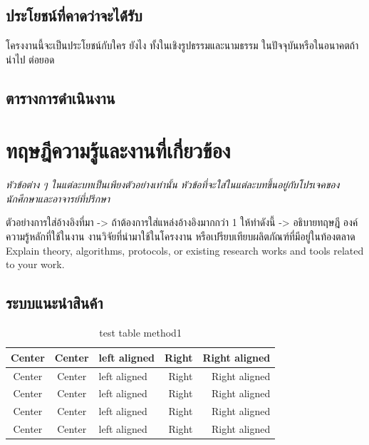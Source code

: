 \documentclass[12pt,oneside,openright,a4paper]{cpe-thai-project}
\begin{document}
\section{ประโยชน์ที่คาดว่าจะได้่รับ}

โครงงานนี้จะเป็นประโยชน์กับใคร ยังไง ทั้งในเชิงรูปธรรมและนามธรรม ในปัจจุบันหรือในอนาคตถ้านำไป
ต่อยอด

\section{ตารางการดำเนินงาน}




\chapter{ทฤษฎีความรู้และงานที่เกี่ยวข้อง}

\emph{หัวข้อต่าง ๆ ในแต่ละบทเป็นเพียงตัวอย่างเท่านั้น หัวข้อที่จะใส่ในแต่ละบทขึ้นอยู่กับโปรเจคของนักศึกษาและอาจารย์ที่ปรึกษา}

ตัวอย่างการใส่อ้างอิงที่มา -> \cite{hypersense} ถ้าต้องการใส่แหล่งอ้างอิงมากกว่า 1 ให้ทำดังนี้ -> \cite{hypersense,bworld}
อธิบายทฤษฎี องค์ความรู้หลักที่ใช้ในงาน งานวิจัยที่นำมาใช้ในโครงงาน หรือเปรียบเทียบผลิตภัณฑ์ที่มีอยู่ในท้องตลาด\cite{bworld}
Explain theory, algorithms, protocols, or existing research works and tools related to your work.


\section{ระบบแนะนำสินค้า}

\begin{table}[!h]
  \caption{test table method1}\label{tbl:method1}
  \begin{tabular}{c|c|l|rr} \hline\hline
    Center & Center & left aligned & Right & Right aligned \\ \hline\hline
    Center & Center & left aligned & Right & Right aligned \\ \hline
    Center & Center & left aligned & Right & Right aligned \\
    Center & Center & left aligned & Right & Right aligned \\ \hline
    Center & Center & left aligned & Right & Right aligned \\ \hline\hline
  \end{tabular}
\end{table}
\end{document}
